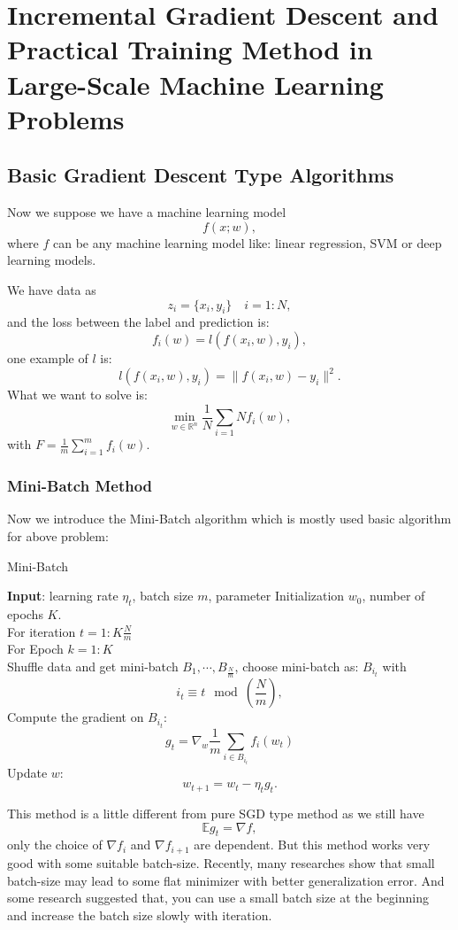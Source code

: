 \section{Incremental Gradient Descent and Practical Training Method in
	Large-Scale Machine Learning Problems}

\subsection{Basic Gradient Descent Type Algorithms}
Now we suppose we have a machine learning model
\begin{equation}
f(x; w),
\end{equation}
where $f$ can be any machine learning model like: linear regression, SVM or deep learning models. 

We have data as 
$$
z_i=\{x_i, y_i\}\quad i = 1:N,
$$
and the loss between the label and prediction is:
$$
f_i(w) = l(f(x_i, w), y_i),
$$
one example of $l$ is:
$$
l(f(x_i, w), y_i) = \|f(x_i, w)- y_i\|^2.
$$
What we want to solve is:
\begin{equation}
\mathop{\min}_{{w} \in \mathbb{R}^{n}} \frac{1}{N}\sum_{i=1}N f_i(w),
\end{equation}
with $F =  \frac{1}{m}\sum_{i=1}^m f_i(w)$.

\subsubsection{Mini-Batch Method}
Now we introduce the Mini-Batch algorithm which is mostly used basic algorithm for above problem:
\begin{algorithm}[H]
\caption{Mini-Batch}
\label{alg:mini-batch}
{\bf Input}: learning rate $\eta_t$, batch size $m$, parameter Initialization $ w_0$, number of epochs $K$. \\
For iteration $t = 1: K\frac{N}{m}$ \\
For Epoch $k = 1:K$\\
Shuffle data and get mini-batch $B_1, \cdots, B_{\frac{N}{m}}$, choose mini-batch as: $B_{i_t}$ with
$$
i_t \equiv t \mod(\frac{N}{m}),
$$
Compute the gradient on $B_{i_t}$:
$$
g_t = \nabla_{w} \frac{1}{m} \sum_{i \in B_{i_t}} f_i(w_{t})
$$
Update $w$:
\begin{equation}
w_{t+1} = w_t - \eta_t g_t.
\end{equation}
\end{algorithm}

This method is a little different from pure SGD type method as we still have
$$
\mathbb{E} g_t = \nabla f,
$$
only the choice of $\nabla f_i$ and $\nabla f_{i+1}$ are dependent.
But this method works very good with some suitable batch-size. Recently, many researches show that small batch-size may lead to some flat minimizer with better generalization error. And some research suggested that, you can use a small batch size at the beginning and increase the batch size slowly with iteration.

